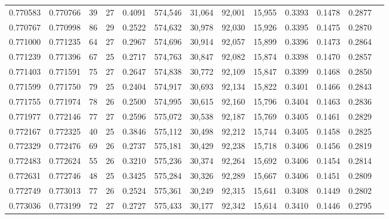 \begin{tabular}{rrrrrrrrrrrrr}
0.770583 & 0.770766 &    39 &  27 &                                     0.4091 & 574,546 &  31,064 &  92,001 &  15,955 & 0.3393 & 0.1478 & 0.2877 \\
0.770767 & 0.770998 &    86 &  29 &                                     0.2522 & 574,632 &  30,978 &  92,030 &  15,926 & 0.3395 & 0.1475 & 0.2870 \\
0.771000 & 0.771235 &    64 &  27 &                                     0.2967 & 574,696 &  30,914 &  92,057 &  15,899 & 0.3396 & 0.1473 & 0.2864 \\
0.771239 & 0.771396 &    67 &  25 &                                     0.2717 & 574,763 &  30,847 &  92,082 &  15,874 & 0.3398 & 0.1470 & 0.2857 \\
0.771403 & 0.771591 &    75 &  27 &                                     0.2647 & 574,838 &  30,772 &  92,109 &  15,847 & 0.3399 & 0.1468 & 0.2850 \\
0.771599 & 0.771750 &    79 &  25 &                                     0.2404 & 574,917 &  30,693 &  92,134 &  15,822 & 0.3401 & 0.1466 & 0.2843 \\
0.771755 & 0.771974 &    78 &  26 &                                     0.2500 & 574,995 &  30,615 &  92,160 &  15,796 & 0.3404 & 0.1463 & 0.2836 \\
0.771977 & 0.772146 &    77 &  27 &                                     0.2596 & 575,072 &  30,538 &  92,187 &  15,769 & 0.3405 & 0.1461 & 0.2829 \\
0.772167 & 0.772325 &    40 &  25 &                                     0.3846 & 575,112 &  30,498 &  92,212 &  15,744 & 0.3405 & 0.1458 & 0.2825 \\
0.772329 & 0.772476 &    69 &  26 &                                     0.2737 & 575,181 &  30,429 &  92,238 &  15,718 & 0.3406 & 0.1456 & 0.2819 \\
0.772483 & 0.772624 &    55 &  26 &                                     0.3210 & 575,236 &  30,374 &  92,264 &  15,692 & 0.3406 & 0.1454 & 0.2814 \\
0.772631 & 0.772746 &    48 &  25 &                                     0.3425 & 575,284 &  30,326 &  92,289 &  15,667 & 0.3406 & 0.1451 & 0.2809 \\
0.772749 & 0.773013 &    77 &  26 &                                     0.2524 & 575,361 &  30,249 &  92,315 &  15,641 & 0.3408 & 0.1449 & 0.2802 \\
0.773036 & 0.773199 &    72 &  27 &                                     0.2727 & 575,433 &  30,177 &  92,342 &  15,614 & 0.3410 & 0.1446 & 0.2795 \\

\end{tabular}
